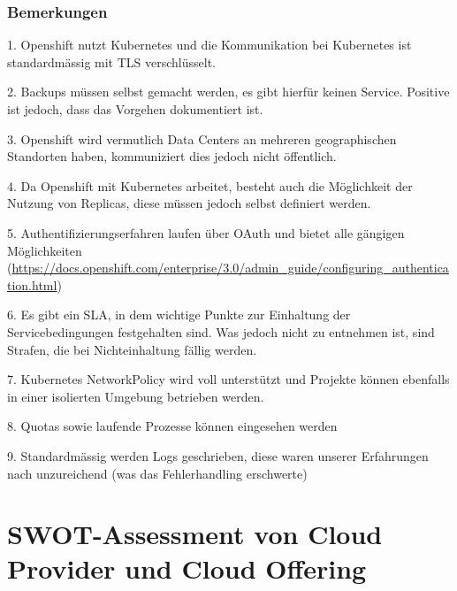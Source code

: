 \documentclass[12pt,a4paper]{article}
\begin{document}
\subsubsection{Bemerkungen}

1. Openshift nutzt Kubernetes und die Kommunikation bei Kubernetes ist standardmässig mit TLS verschlüsselt.

2. Backups müssen selbst gemacht werden, es gibt hierfür keinen Service. Positive ist jedoch, dass das Vorgehen dokumentiert ist.

3. Openshift wird vermutlich Data Centers an mehreren geographischen Standorten haben, kommuniziert dies jedoch nicht öffentlich.

4. Da Openshift mit Kubernetes arbeitet, besteht auch die Möglichkeit der Nutzung von Replicas, diese müssen jedoch selbst definiert werden.

5. Authentifizierungserfahren laufen über OAuth und bietet alle gängigen Möglichkeiten (\url{https://docs.openshift.com/enterprise/3.0/admin_guide/configuring_authentication.html})

6. Es gibt ein SLA, in dem wichtige Punkte zur Einhaltung der Servicebedingungen festgehalten sind. Was jedoch nicht zu entnehmen ist, sind Strafen, die bei Nichteinhaltung fällig werden.

7. Kubernetes NetworkPolicy wird voll unterstützt und Projekte können ebenfalls in einer isolierten Umgebung betrieben werden.

8. Quotas sowie laufende Prozesse können eingesehen werden

9. Standardmässig werden Logs geschrieben, diese waren unserer Erfahrungen nach unzureichend (was das Fehlerhandling erschwerte)

\section{SWOT-Assessment von Cloud Provider und Cloud Offering}
\end{document}
